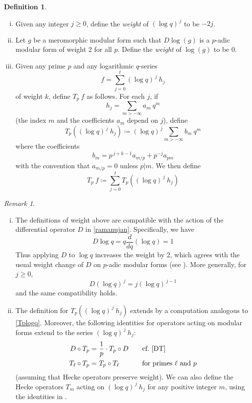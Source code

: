 \documentclass{gtpart}
\theoremstyle{definition}
\newtheorem{defn}[thm]{Definition}
\theoremstyle{remark}
\newtheorem{rmk}[thm]{Remark}
\newcommand{\ce}{\coloneqq}
\renewcommand{\=}{\approx}
\renewcommand{\-}{\sim}
\numberwithin{equation}{section}
\numberwithin{thm}{section}
\begin{document}
\begin{defn}
 \label{def:logq}
 \mbox{}
 \begin{enumerate}[(i)]
  \item Given any integer $j \geq 0$, define the {\em weight} of $(\log q)^{\,j}$ to be $-2 j$.  

  \item \label{ii} Let $g$ be a meromorphic modular form 
  such that $D \log(g)$ is a $p$-adic modular form of weight 2 for all $p$.  
  Define the {\em weight} of $\log(g)$ to be 0.  

  \item \label{iii} Given any prime $p$ and any logarithmic $q$-series 
  \[
   f = \sum_{j=0}^t (\log q)^{\,j} ~\! h_j 
  \]
  of weight $k$, define $T_p~f$ as follows.  
  For each $j$, if 
  \[
   h_j = \sum_{m > -\infty} a_m ~\! q^m 
  \]
  (the index $m$ and the coefficients $a_m$ depend on $j$), define 
  \[
   T_p \! \left( (\log q)^{\,j} ~\! h_j \right) \ce (\log q)^{\,j} \sum_{m > -\infty} b_m ~\! q^m 
  \]
  where the coefficients 
  \[
   b_m = p^{\,j + k - 1} a_{m/p} + p^{-j} a_{p m} 
  \]
  with the convention that $a_{m/p} = 0$ unless $p|m$.  
  We then define 
  \[
   T_p~f \ce \sum_{j=0}^t T_p \! \left( (\log q)^{\,j} ~\! h_j \right) 
  \]
 \end{enumerate}
\end{defn}
\begin{rmk}
 \mbox{}
 \begin{enumerate}[(i)]
  \item The definitions of weight above are compatible with the action of the differential operator $D$ in \eqref{ramanujan}.  
  Specifically, we have 
  \[
   D \log q = q \frac{d}{dq} (\log q) = 1 
  \]
  Thus applying $D$ to $\log q$ increases the weight by 2, 
  which agrees with the usual weight change of $D$ on $p$-adic modular forms (see \cite[Th\'eor\`eme 5(a)]{fmpadiq}).  
  More generally, for $j \geq 0$, 
  \[
   D (\log q)^{\,j} = j (\log q)^{\,j - 1} 
  \]
  and the same compatibility holds.  

  \item The definition for $T_p \! \left( (\log q)^{\,j} ~\! h_j \right)$ 
  extends \cite[Formula 1.11.1]{padicprop} by a computation analogous to \eqref{Tplogq}.  
  Moreover, the following identities for operators acting on modular forms extend to the series $(\log q)^{\,j} ~\! h_j$: 
  \begin{equation*}
   \begin{split}
         D \circ T_p = & ~ \frac{1}{p} \cdot T_p \circ D \qquad \text{cf.~\eqref{DT}} \\
    T_\ell \circ T_p = & ~ T_p \circ T_\ell \qquad\quad~ \text{for primes $\ell$ and $p$} 
   \end{split}
  \end{equation*}
  (assuming that Hecke operators preserve weight).  
  We can also define the Hecke operators $T_m$ acting on $(\log q)^{\,j} ~\! h_j$ 
  for any positive integer $m$, using the identities in \cite[Remarque after Th\'eor\`eme 4]{fmpadiq}.  
 \end{enumerate}
\end{rmk}
\end{document}
